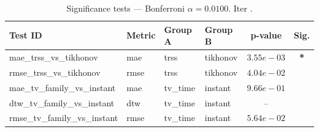 ﻿%
\begin{table}[ht]
\centering
\caption[EEG reconstruction - Iteration it38]{Significance tests — Bonferroni $\alpha=0.0100$. Iter .}
\label{tab:sig_it38_broad_gaussian_kalofolias_nnk}
\small
\begin{tabular}{llllcc}
\toprule
Test ID & Metric & Group A & Group B & p-value & Sig. \\
\midrule
mae\_trss\_vs\_tikhonov & mae & trss & tikhonov & $3.55e-03$ & \textbf{*} \\
rmse\_trss\_vs\_tikhonov & rmse & trss & tikhonov & $4.04e-02$ &  \\
mae\_tv\_family\_vs\_instant & mae & tv\_time & instant & $9.66e-01$ &  \\
dtw\_tv\_family\_vs\_instant & dtw & tv\_time & instant & -- &  \\
rmse\_tv\_family\_vs\_instant & rmse & tv\_time & instant & $5.64e-02$ &  \\
\bottomrule
\end{tabular}
\end{table}







